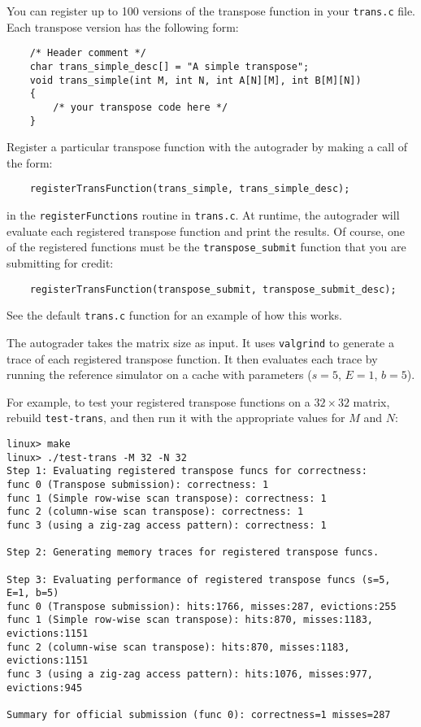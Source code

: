 \documentclass[11pt]{article}
\begin{document}
You can register up to 100 versions of the transpose function in your
{\tt  trans.c} file. Each transpose version has the following form:
\begin{verbatim}
    /* Header comment */
    char trans_simple_desc[] = "A simple transpose";
    void trans_simple(int M, int N, int A[N][M], int B[M][N])
    {
        /* your transpose code here */
    }
\end{verbatim}
Register a particular transpose function with the autograder by making
a call of the form:
\begin{verbatim}
    registerTransFunction(trans_simple, trans_simple_desc);
\end{verbatim}
in the {\tt registerFunctions} routine in {\tt trans.c}. At runtime,
the autograder will evaluate each registered transpose function and
print the results. Of course, one of the registered functions must be
the \verb:transpose_submit: function that you are submitting for
credit:
\begin{verbatim}
    registerTransFunction(transpose_submit, transpose_submit_desc);
\end{verbatim}
See the default {\tt trans.c} function for an example of how this works. 

The autograder takes the matrix size as input. It uses {\tt valgrind}
to generate a trace of each registered transpose function.  It then
evaluates each trace by running the reference simulator on a cache
with parameters ($s=5$, $E=1$, $b=5$).

For example, to test your registered transpose functions on a $32
\times 32$ matrix, rebuild \verb:test-trans:, and then run it with the 
appropriate values for $M$ and $N$:
{\small
\begin{verbatim}
linux> make
linux> ./test-trans -M 32 -N 32
Step 1: Evaluating registered transpose funcs for correctness:
func 0 (Transpose submission): correctness: 1
func 1 (Simple row-wise scan transpose): correctness: 1
func 2 (column-wise scan transpose): correctness: 1
func 3 (using a zig-zag access pattern): correctness: 1

Step 2: Generating memory traces for registered transpose funcs.

Step 3: Evaluating performance of registered transpose funcs (s=5, E=1, b=5)
func 0 (Transpose submission): hits:1766, misses:287, evictions:255
func 1 (Simple row-wise scan transpose): hits:870, misses:1183, evictions:1151
func 2 (column-wise scan transpose): hits:870, misses:1183, evictions:1151
func 3 (using a zig-zag access pattern): hits:1076, misses:977, evictions:945

Summary for official submission (func 0): correctness=1 misses=287
\end{verbatim}
} 
\end{document}
